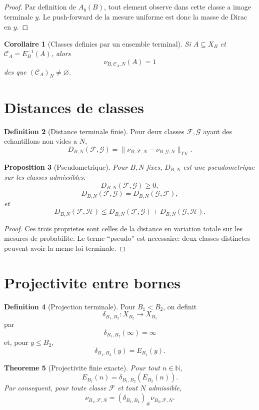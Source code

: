\documentclass[11pt]{article}
\theoremstyle{plain}
\newtheorem{theorem}{Theoreme}[section]
\newtheorem{proposition}[theorem]{Proposition}
\newtheorem{corollary}[theorem]{Corollaire}
\theoremstyle{definition}
\newtheorem{definition}[theorem]{Definition}
\theoremstyle{remark}
\newcommand{\N}{\mathbb N}
\newcommand{\TV}{\mathrm{TV}}
\newcommand{\1}{\mathbf 1}
\newcommand{\F}{\mathcal F}
\newcommand{\G}{\mathcal G}
\newcommand{\push}{_{\#}}
\begin{document}
\begin{proof}
Par definition de \(A_y(B)\), tout element observe dans cette classe a image
terminale \(y\). Le push-forward de la mesure uniforme est donc la masse de
Dirac en \(y\).
\end{proof}

\begin{corollary}[Classes definies par un ensemble terminal]
Si \(A\subseteq X_B\) et \(\mathcal C_A=E_B^{-1}(A)\), alors
\[
\nu_{B,\mathcal C_A,N}(A)=1
\]
des que \((\mathcal C_A)_N\ne\varnothing\).
\end{corollary}

\section{Distances de classes}

\begin{definition}[Distance terminale finie]
Pour deux classes \(\F,\G\) ayant des echantillons non vides a \(N\),
\[
D_{B,N}(\F,\G)
=
\|\nu_{B,\F,N}-\nu_{B,\G,N}\|_{\TV}.
\]
\end{definition}

\begin{proposition}[Pseudometrique]
Pour \(B,N\) fixes, \(D_{B,N}\) est une pseudometrique sur les classes
admissibles:
\[
D_{B,N}(\F,\G)\ge0,
\]
\[
D_{B,N}(\F,\G)=D_{B,N}(\G,\F),
\]
et
\[
D_{B,N}(\F,\mathcal H)\le
D_{B,N}(\F,\G)+D_{B,N}(\G,\mathcal H).
\]
\end{proposition}

\begin{proof}
Ces trois proprietes sont celles de la distance en variation totale sur les
mesures de probabilite. Le terme ``pseudo'' est necessaire: deux classes
distinctes peuvent avoir la meme loi terminale.
\end{proof}

\section{Projectivite entre bornes}

\begin{definition}[Projection terminale]
Pour \(B_1<B_2\), on definit
\[
\delta_{B_1,B_2}:X_{B_2}\to X_{B_1}
\]
par
\[
\delta_{B_1,B_2}(\infty)=\infty
\]
et, pour \(y\le B_2\),
\[
\delta_{B_1,B_2}(y)=E_{B_1}(y).
\]
\end{definition}

\begin{theorem}[Projectivite finie exacte]
Pour tout \(n\in\N\),
\[
E_{B_1}(n)=\delta_{B_1,B_2}(E_{B_2}(n)).
\]
Par consequent, pour toute classe \(\F\) et tout \(N\) admissible,
\[
\nu_{B_1,\F,N}
=
(\delta_{B_1,B_2})\push\nu_{B_2,\F,N}.
\]
\end{theorem}
\end{document}
